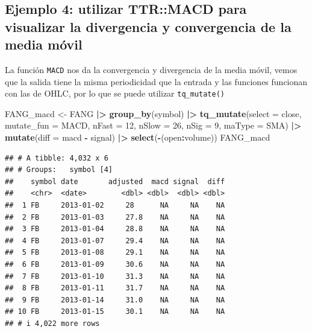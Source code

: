\documentclass[
]{book}
\newenvironment{Shaded}{\begin{snugshade}}{\end{snugshade}}
\newcommand{\AttributeTok}[1]{\textcolor[rgb]{0.13,0.29,0.53}{#1}}
\newcommand{\DecValTok}[1]{\textcolor[rgb]{0.00,0.00,0.81}{#1}}
\newcommand{\FunctionTok}[1]{\textcolor[rgb]{0.13,0.29,0.53}{\textbf{#1}}}
\newcommand{\NormalTok}[1]{#1}
\newcommand{\OtherTok}[1]{\textcolor[rgb]{0.56,0.35,0.01}{#1}}
\newcommand{\SpecialCharTok}[1]{\textcolor[rgb]{0.81,0.36,0.00}{\textbf{#1}}}
\begin{document}
\hypertarget{ejemplo-4-utilizar-ttrmacd-para-visualizar-la-divergencia-y-convergencia-de-la-media-muxf3vil}{%
\subsection{Ejemplo 4: utilizar TTR::MACD para visualizar la divergencia y convergencia de la media móvil}\label{ejemplo-4-utilizar-ttrmacd-para-visualizar-la-divergencia-y-convergencia-de-la-media-muxf3vil}}

La función \texttt{MACD} nos da la convergencia y divergencia de la media móvil, vemos que la salida tiene la misma periodicidad que la entrada y las funciones funcionan con las de OHLC, por lo que se puede utilizar \texttt{tq\_mutate()}

\begin{Shaded}
\begin{Highlighting}[]
\NormalTok{FANG\_macd }\OtherTok{\textless{}{-}}\NormalTok{ FANG }\SpecialCharTok{|\textgreater{}} \FunctionTok{group\_by}\NormalTok{(symbol) }\SpecialCharTok{|\textgreater{}} 
                     \FunctionTok{tq\_mutate}\NormalTok{(}\AttributeTok{select =}\NormalTok{ close,}
                               \AttributeTok{mutate\_fun =}\NormalTok{ MACD,}
                               \AttributeTok{nFast =} \DecValTok{12}\NormalTok{,}
                               \AttributeTok{nSlow =} \DecValTok{26}\NormalTok{,}
                               \AttributeTok{nSig =} \DecValTok{9}\NormalTok{,}
                               \AttributeTok{maType =}\NormalTok{ SMA) }\SpecialCharTok{|\textgreater{}} 
                     \FunctionTok{mutate}\NormalTok{(}\AttributeTok{diff =}\NormalTok{ macd }\SpecialCharTok{{-}}\NormalTok{ signal) }\SpecialCharTok{|\textgreater{}} 
                     \FunctionTok{select}\NormalTok{(}\SpecialCharTok{{-}}\NormalTok{(open}\SpecialCharTok{:}\NormalTok{volume))}
\NormalTok{FANG\_macd}
\end{Highlighting}
\end{Shaded}

\begin{verbatim}
## # A tibble: 4,032 x 6
## # Groups:   symbol [4]
##    symbol date       adjusted  macd signal  diff
##    <chr>  <date>        <dbl> <dbl>  <dbl> <dbl>
##  1 FB     2013-01-02     28      NA     NA    NA
##  2 FB     2013-01-03     27.8    NA     NA    NA
##  3 FB     2013-01-04     28.8    NA     NA    NA
##  4 FB     2013-01-07     29.4    NA     NA    NA
##  5 FB     2013-01-08     29.1    NA     NA    NA
##  6 FB     2013-01-09     30.6    NA     NA    NA
##  7 FB     2013-01-10     31.3    NA     NA    NA
##  8 FB     2013-01-11     31.7    NA     NA    NA
##  9 FB     2013-01-14     31.0    NA     NA    NA
## 10 FB     2013-01-15     30.1    NA     NA    NA
## # i 4,022 more rows
\end{verbatim}
\end{document}
